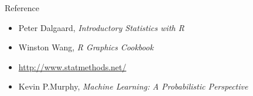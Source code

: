 \documentclass[ignorenonframetext,]{beamer}
\begin{document}
\begin{frame}{Reference}

\begin{itemize}
\itemsep1pt\parskip0pt
\item
  Peter Dalgaard, \emph{Introductory Statistics with R}
\item
  Winston Wang, \emph{R Graphics Cookbook}
\item
  \url{http://www.statmethods.net/}\\
\item
  Kevin P.Murphy, \emph{Machine Learning: A Probabilistic Perspective}
\end{itemize}

\end{frame}
\end{document}
